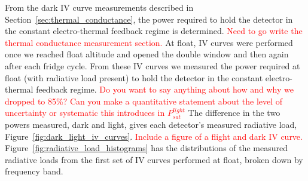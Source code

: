 From the dark IV curve measurements described in Section~\ref{sec:thermal_conductance}, the power required to hold the detector in the constant electro-thermal feedback regime is determined.
\textcolor{red}{Need to go write the thermal conductance measurement section.} 
At float, IV curves were performed once we reached float altitude and opened the double window and then again after each fridge cycle. 
From these IV curves we measured the power required at float (with radiative load present) to hold the detector in the constant electro-thermal feedback regime. 
\textcolor{red}{Do you want to say anything about how and why we dropped to 85\%? Can you make a quantitative statement about the level of uncertainty or systematic this introduces in $P_{sat}^{light}$}
The difference in the two powers measured, dark and light, gives each detector's measured radiative load, Figure~\ref{fig:dark_light_iv_curves}. 
\textcolor{red}{Include a figure of a flight and dark IV curve.}
Figure~\ref{fig:radiative_load_histograms} has the distributions of the measured radiative loads from the first set of IV curves performed at float, broken down by frequency band. 

